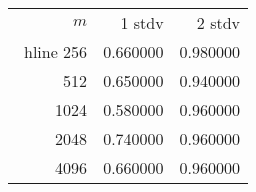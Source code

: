 \begin{tabular}{rrr}
$m$& 1 stdv & 2 stdv\\\ hline
256&0.660000&0.980000\\
512&0.650000&0.940000\\
1024&0.580000&0.960000\\
2048&0.740000&0.960000\\
4096&0.660000&0.960000\\
\end{tabular}
